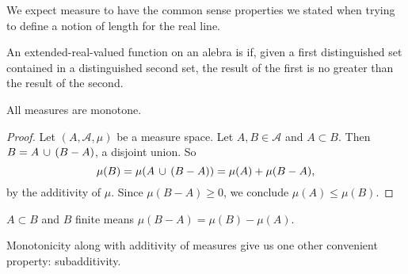
\sbasic


























\sstart
{}


We expect measure to have the
common sense properties we stated
when trying to define a notion of
length for the real line.


An extended-real-valued function on an
alebra is
if, given a first distinguished set contained in
a distinguished second set, the result of the
first is no greater than the result of the second.

\begin{prop}
  All measures are monotone.
  \begin{proof}
    Let $(A, \mathcal{A}, \mu)$ be
    a measure space.
    Let $A, B \in \mathcal{A}$
    and $A \subset B$.
    Then $B = A \,\cup\, (B - A)$,
    a disjoint union.
    So
    \[
      \mu(B) = \mu(A \,\cup\, (B - A))= \mu(A) + \mu(B - A),
    \]
    by the additivity of $\mu$.
    Since $\mu(B - A) \geq 0$,
    we conclude $\mu(A) \leq \mu(B)$.
  \end{proof}
\end{prop}

\begin{prop}
  $A \subset B$ and $B$ finite
  means $\mu(B - A) = \mu(B) - \mu(A)$.
\end{prop}



Monotonicity along with additivity of
measures give us one other convenient
property: subadditivity.


